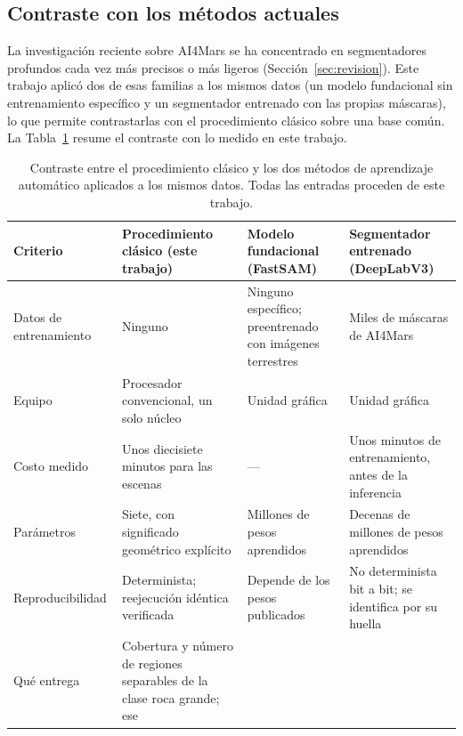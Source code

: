 \subsection{Contraste con los métodos actuales}
\label{sec:contraste-metodos}

La investigación reciente sobre AI4Mars se ha concentrado en segmentadores profundos cada vez
más precisos o más ligeros (Sección~\ref{sec:revision}). Este trabajo aplicó dos de esas
familias a los mismos datos (un modelo fundacional sin entrenamiento específico y un segmentador
entrenado con las propias máscaras), lo que permite contrastarlas con el procedimiento clásico
sobre una base común. La Tabla~\ref{tab:contraste-metodos} resume el contraste con lo medido en
este trabajo.

\begin{table}[htbp]
  \centering
  \small
  \caption[Contraste entre el procedimiento clásico y los métodos de aprendizaje
    automático]{Contraste entre el procedimiento clásico y los dos métodos de aprendizaje
    automático aplicados a los mismos datos. Todas las entradas proceden de este trabajo.}
  \label{tab:contraste-metodos}
  \begin{tabular}{>{\raggedright\arraybackslash}p{2.6cm}>{\raggedright\arraybackslash}p{3.9cm}>{\raggedright\arraybackslash}p{3.5cm}>{\raggedright\arraybackslash}p{3.5cm}}
    \toprule
    \textbf{Criterio} & \textbf{Procedimiento clásico (este trabajo)} &
      \textbf{Modelo fundacional (FastSAM)} & \textbf{Segmentador entrenado (DeepLabV3)} \\
    \midrule
    Datos de entrenamiento & Ninguno & Ninguno específico; preentrenado con imágenes
      terrestres & Miles de máscaras de AI4Mars \\
    Equipo & Procesador convencional, un solo núcleo & Unidad gráfica & Unidad gráfica \\
    Costo medido & Unos diecisiete minutos para las \cNEscenas{} escenas & --- & Unos
      \cSegMinTotal{} minutos de entrenamiento, antes de la inferencia \\
    Parámetros & Siete, con significado geométrico explícito & Millones de pesos aprendidos &
      Decenas de millones de pesos aprendidos \\
    Reproducibilidad & Determinista; reejecución idéntica verificada & Depende de los pesos
      publicados & No determinista bit a bit; se identifica por su huella \\
    Qué entrega & Cobertura y número de regiones separables de la clase roca grande; ese

\end{tabular}
\end{table}
